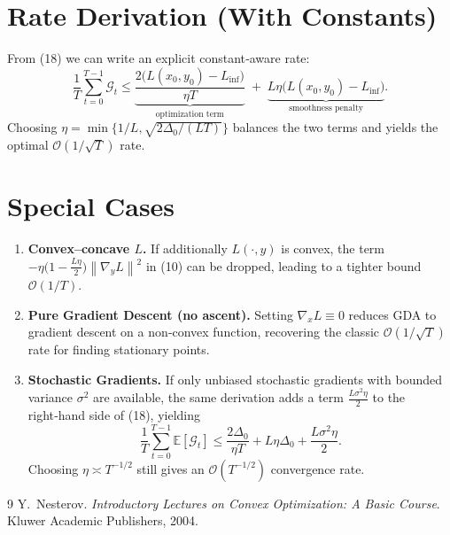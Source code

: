\documentclass{article}
\newcommand{\E}{\mathbb{E}}
\newcommand{\norm}[1]{\left\| #1 \right\|}
\begin{document}
\section*{Rate Derivation (With Constants)}
From (18) we can write an explicit constant‑aware rate:
\[
\boxed{
\frac{1}{T}\sum_{t=0}^{T-1}\mathcal{G}_t
\le
\underbrace{\frac{2\big(L(x_0,y_0)-L_{\inf}\big)}{\eta T}}_{\text{optimization term}}
\;+\;
\underbrace{L\eta\big(L(x_0,y_0)-L_{\inf}\big)}_{\text{smoothness penalty}} }.
\]
Choosing \(\eta=\min\{1/L,\sqrt{2\Delta_0/(L T)}\}\) balances the two terms and yields the optimal \(\mathcal{O}(1/\sqrt{T})\) rate.

\section*{Special Cases}
\begin{enumerate}
\item \textbf{Convex–concave \(L\).} If additionally \(L(\cdot,y)\) is convex,
the term \(-\eta\bigl(1-\tfrac{L\eta}{2}\bigr)\norm{\nabla_y L}^{2}\) in (10) can be dropped,
leading to a tighter bound \(\mathcal{O}(1/T)\).
\item \textbf{Pure Gradient Descent (no ascent).} Setting \(\nabla_x L\equiv0\) reduces GDA to
gradient descent on a non‑convex function, recovering the classic
\(\mathcal{O}(1/\sqrt{T})\) rate for finding stationary points.
\item \textbf{Stochastic Gradients.} If only unbiased stochastic gradients with bounded variance \(\sigma^{2}\) are available,
the same derivation adds a term \(\frac{L\sigma^{2}\eta}{2}\) to the right‑hand side of (18),
yielding
\[
\frac{1}{T}\sum_{t=0}^{T-1}\E[\mathcal{G}_t]
\le
\frac{2\Delta_0}{\eta T}+L\eta\Delta_0+\frac{L\sigma^{2}\eta}{2}.
\]
Choosing \(\eta\asymp T^{-1/2}\) still gives an \(\mathcal{O}(T^{-1/2})\) convergence rate.
\end{enumerate}

\begin{thebibliography}{9}
Y.~Nesterov.
\newblock \emph{Introductory Lectures on Convex Optimization: A Basic Course}.
\newblock Kluwer Academic Publishers, 2004.
\end{thebibliography}
\end{document}
